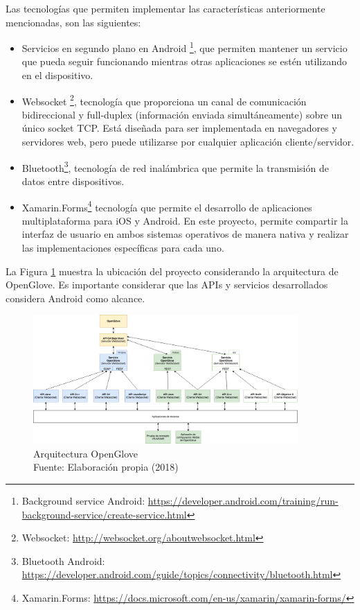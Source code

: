 Las tecnologías que permiten implementar las características anteriormente mencionadas, son las siguientes:
\begin{itemize}

\item Servicios en segundo plano en Android \footnote{Background service Android: \url{https://developer.android.com/training/run-background-service/create-service.html}}, que permiten mantener un servicio que pueda seguir funcionando mientras otras aplicaciones se estén utilizando en el dispositivo.

\item Websocket \footnote{Websocket: \url{http://websocket.org/aboutwebsocket.html}}, tecnología que proporciona un canal de comunicación bidireccional y full-duplex (información enviada simultáneamente) sobre un único socket TCP. Está diseñada para ser implementada en navegadores y servidores web, pero puede utilizarse por cualquier aplicación cliente/servidor.

\item Bluetooth\footnote{Bluetooth Android: \url{https://developer.android.com/guide/topics/connectivity/bluetooth.html}}, tecnología de red inalámbrica que permite la transmisión de datos entre dispositivos.

\item Xamarin.Forms\footnote{Xamarin.Forms: \url{https://docs.microsoft.com/en-us/xamarin/xamarin-forms/}} tecnología que permite el desarrollo de aplicaciones multiplataforma para iOS y Android. En este proyecto, permite compartir la interfaz de usuario en ambos sistemas operativos de manera nativa y realizar las implementaciones específicas para cada uno.

\end{itemize}

La Figura \ref{fig:propuesta-arquitectura-open-glove} muestra la ubicación del proyecto considerando la arquitectura de OpenGlove. Es importante considerar que las APIs y servicios desarrollados considera Android como alcance.

\begin{figure}[H]
  \begin{center} 
   	\includegraphics[width=0.9\textwidth]{images/fig-arquitectura/OpenGlove-Architecture-02.png} 
    \caption[Arquitectura Openglove]{Arquitectura OpenGlove \\Fuente: Elaboración propia (2018)}
    \label{fig:propuesta-arquitectura-open-glove}
  \end{center}
\end{figure}

